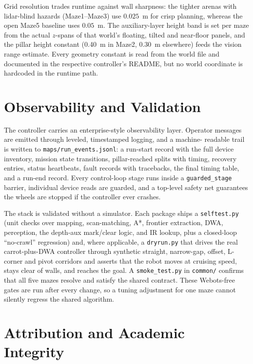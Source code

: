 \documentclass[11pt,a4paper]{article}
\newcommand{\code}[1]{\colorbox{codegray}{\texttt{\small #1}}}
\begin{document}
Grid resolution trades runtime against wall sharpness: the tighter arenas with
lidar-blind hazards (Maze1--Maze3) use $0.025$~m for crisp planning, whereas
the open Maze5 baseline uses $0.05$~m. The auxiliary-layer height band is set
per maze from the actual $z$-spans of that world's floating, tilted and
near-floor panels, and the pillar height constant (0.40~m in Maze2, 0.30~m
elsewhere) feeds the vision range estimate. Every geometry constant is read
from the world file and documented in the respective controller's README, but
no world coordinate is hardcoded in the runtime path.

\section{Observability and Validation}

The controller carries an enterprise-style observability layer. Operator
messages are emitted through leveled, timestamped logging, and a machine-
readable trail is written to \code{maps/run\_events.jsonl}: a run-start record
with the full device inventory, mission state transitions, pillar-reached
splits with timing, recovery entries, status heartbeats, fault records with
tracebacks, the final timing table, and a run-end record. Every control-loop
stage runs inside a \code{guarded\_stage} barrier, individual device reads are
guarded, and a top-level safety net guarantees the wheels are stopped if the
controller ever crashes.

The stack is validated without a simulator. Each package ships a
\code{selftest.py} (unit checks over mapping, scan-matching, A*, frontier
extraction, DWA, perception, the depth-aux mark/clear logic, and IR lookup,
plus a closed-loop ``no-crawl'' regression) and, where applicable, a
\code{dryrun.py} that drives the real carrot-plus-DWA controller through
synthetic straight, narrow-gap, offset, L-corner and pivot corridors and
asserts that the robot moves at cruising speed, stays clear of walls, and
reaches the goal. A \code{smoke\_test.py} in \code{common/} confirms that all
five mazes resolve and satisfy the shared contract. These Webots-free gates are
run after every change, so a tuning adjustment for one maze cannot silently
regress the shared algorithm.

\section{Attribution and Academic Integrity}
\end{document}
